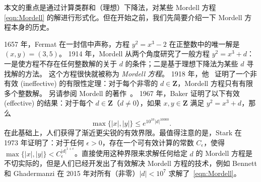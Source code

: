 \documentclass[sigplan,10pt,nonacm,
screen]{acmart} \settopmatter{printfolios=true,printccs=false,printacmref=false}
\newcommand{\ZZ}{\mathbf{Z}}
\begin{document}
本文的重点是通过计算类群和（理想）下降法，对某些 Mordell 方程 \eqref{eqn:Mordell} 的解进行形式化。但在开始之前，我们先简要介绍一下 Mordell 方程本身的历史。

1657 年，Fermat 在一封信中声称，方程 $y^2 = x^3 - 2$ 在正整数中的唯一解是 $(x,y)= (3, 5)$。
%
1914 年，Mordell \cite{mordell14} 从两个角度研究了一般方程 $y^2 = x^3 + d$：一是使方程不存在任何整数解的关于 $d$ 的条件；二是基于理想下降法为某些 $d$ 寻找解的方法。
这个方程很快就被称为 \emph{Mordell 方程}。
%
1918 年，他~\cite{mordell1920} 证明了一个非有效 (ineffective) 的有限性定理：对于每个非零的 $d \in \ZZ$，Mordell 方程只有有限多个整数解。
另请参阅 Mordell 的著作~\cite[第 26 章]{mordell1969diophantine}。
%
%
1967 年，Baker \cite{baker68} 证明了以下有效 (effective) 的结果：对于每个 $d \in \ZZ$（$d \neq 0$），如果 $x,y \in \ZZ$ 满足 $y^2=x^3+d$，那么
    \begin{equation}\label{eqn:BakerBoundMordell}
        \max\{|x|,|y|\} \leq e^{10^{10}|d|^{10000}}.
    \end{equation}
%
%
在此基础上，人们获得了渐近更尖锐的有效界限。最值得注意的是，Stark \cite{Stark1973} 在 1973 年证明了：对于任何 $\epsilon >0$，存在一个可有效计算的常数 $C_\epsilon$，使得 $\max\{|x|,|y|\}<C_\epsilon^{|d|^{1+\epsilon}}$。直接使用这种界限来求解任何给定 $d$ 的 Mordell 方程是不切实际的，但是人们已经开发出了有效解决 Mordell 方程的技术，例如 Bennett 和 Ghadermanzi \cite{bennett_mordells_2015} 在 2015 年对所有（非零）$|d|<10^7$ 求解了~\eqref{eqn:Mordell}。
\end{document}
